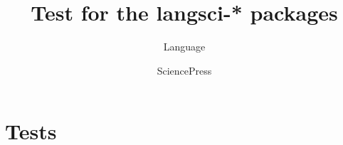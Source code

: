 \documentclass[output=book
	      ,nonflat
	      ,modfonts
	      ]{langsci/langscibook}
\title{Test for the langsci-* packages}
\author{Language\and Science\lastand Press}
\begin{document}
\chapter{Tests} 
% 
% 
% 
% 
% 
% 
% 
% 
% 
% 
% 
% 
% 
% 
% 
% 

% 
% 
% 
% 
% 
% 
% 
% 
%   
% 
%  
% 
% 
\end{document}
